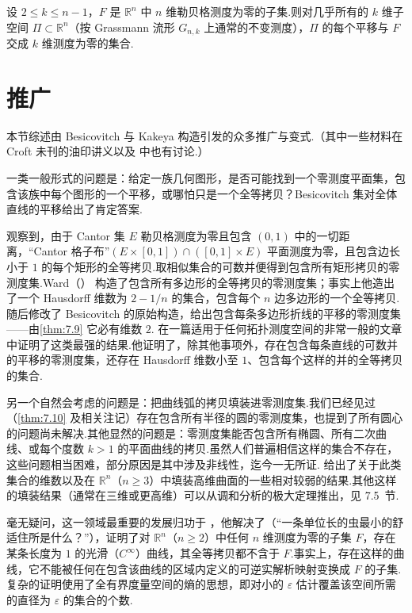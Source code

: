 \begin{theorem}\label{thm:7.13}
设 $2\leq k\leq n-1$，$F$ 是 $\mathbb{R}^n$ 中 $n$ 维勒贝格测度为零的子集.则对几乎所有的 $k$ 维子空间 $\Pi\subset\mathbb{R}^n$（按 Grassmann 流形 $G_{n,k}$ 上通常的不变测度），$\Pi$ 的每个平移与 $F$ 交成 $k$ 维测度为零的集合.
\end{theorem}

\section{推广}

本节综述由 Besicovitch 与 Kakeya 构造引发的众多推广与变式.（其中一些材料在 Croft 未刊的油印讲义以及 \textcite{davies1971,cunningham1974,taylor1975} 中也有讨论.）

一类一般形式的问题是：给定一族几何图形，是否可能找到一个零测度平面集，包含该族中每个图形的一个平移，或哪怕只是一个全等拷贝？Besicovitch 集对全体直线的平移给出了肯定答案.

\textcite{kinney1968} 观察到，由于 Cantor 集 $E$ 勒贝格测度为零且包含 $(0,1)$ 中的一切距离，``Cantor 格子布''$(E\times[0,1])\cap([0,1]\times E)$ 平面测度为零，且包含边长小于 $1$ 的每个矩形的全等拷贝.取相似集合的可数并便得到包含所有矩形拷贝的零测度集.Ward（\citeyear{ward1970a,ward1970b}） 构造了包含所有多边形的全等拷贝的零测度集；事实上他造出了一个 Hausdorff 维数为 $2-1/n$ 的集合，包含每个 $n$ 边多边形的一个全等拷贝.\textcite{davies1971} 随后修改了 Besicovitch 的原始构造，给出包含每条多边形折线的平移的零测度集——由\cref{thm:7.9} 它必有维数 $2$.\textcite{marstrand1972} 在一篇适用于任何拓扑测度空间的非常一般的文章中证明了这类最强的结果.他证明了，除其他事项外，存在包含每条直线的可数并的平移的零测度集，还存在 Hausdorff 维数小至 $1$、包含每个这样的并的全等拷贝的集合.

另一个自然会考虑的问题是：把曲线弧的拷贝填装进零测度集.我们已经见过（\cref{thm:7.10} 及相关注记）存在包含所有半径的圆的零测度集，也提到了所有圆心的问题尚未解决.其他显然的问题是：零测度集能否包含所有椭圆、所有二次曲线、或每个度数 $k>1$ 的平面曲线的拷贝.虽然人们普遍相信这样的集合不存在，这些问题相当困难，部分原因是其中涉及非线性，迄今一无所证.\textcite{falconer1982} 给出了关于此类集合的维数以及在 $\mathbb{R}^n$（$n\geq 3$）中填装高维曲面的一些相对较弱的结果.其他这样的填装结果（通常在三维或更高维）可以从调和分析的极大定理推出，见 7.5~节.

毫无疑问，这一领域最重要的发展归功于 \textcite{marstrand1979a}，他解决了（``一条单位长的虫最小的舒适住所是什么？''），证明了对 $\mathbb{R}^n$（$n\geq 2$）中任何 $n$ 维测度为零的子集 $F$，存在某条长度为 $1$ 的光滑（$C^\infty$）曲线，其全等拷贝都不含于 $F$.事实上，存在这样的曲线，它不能被任何在包含该曲线的区域内定义的可逆实解析映射变换成 $F$ 的子集.复杂的证明使用了全有界度量空间的熵的思想，即对小的 $\varepsilon$ 估计覆盖该空间所需的直径为 $\varepsilon$ 的集合的个数.

